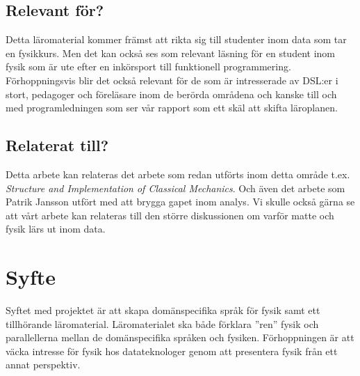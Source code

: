 \documentclass[12pt,a4paper]{article}
\begin{document}
\subsection{Relevant för?}

Detta läromaterial kommer främst att rikta sig till studenter inom data som tar en fysikkurs. Men det kan också ses som relevant läsning för en student inom fysik som är ute efter en inkörsport till funktionell programmering.
%
Förhoppningsvis blir det också relevant för de som är intresserade av DSL:er i stort, pedagoger och föreläsare inom de berörda områdena
%
och kanske till och med programledningen som ser vår rapport som ett skäl att skifta läroplanen.

\subsection{Relaterat till?}

Detta arbete kan relateras det arbete som redan utförts inom detta område t.ex. \textit{Structure and Implementation of Classical Mechanics}\cite{SICM}.
Och även det arbete som Patrik Jansson utfört med att brygga gapet inom analys.
Vi skulle också gärna se att vårt arbete kan relateras till den större diskussionen om varför matte och fysik lärs ut inom data.


\section{Syfte}

Syftet med projektet är att skapa domänspecifika språk för fysik samt ett tillhörande läromaterial. Läromaterialet ska både förklara ''ren'' fysik och parallellerna mellan de domänspecifika språken och fysiken. Förhoppningen är att väcka intresse för fysik hos datateknologer genom att presentera fysik från ett annat perspektiv.

%
\end{document}
